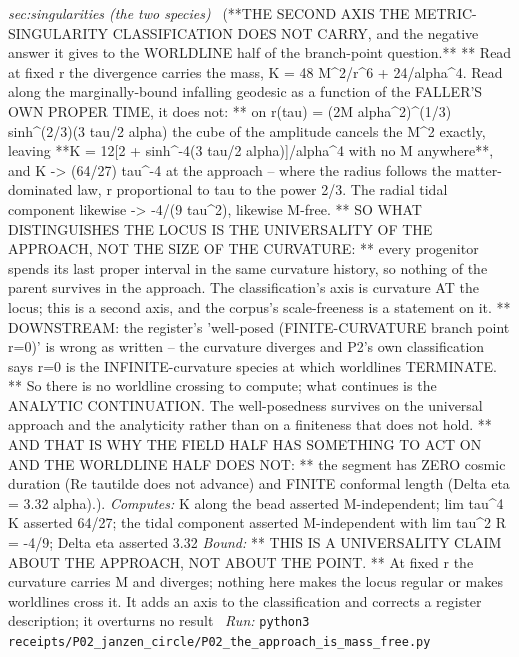 \begin{description}
\textit{sec:singularities (the two species)} \ (**THE SECOND AXIS THE METRIC-SINGULARITY CLASSIFICATION DOES NOT CARRY, and the negative answer it gives to the WORLDLINE half of the branch-point question.** ** Read at fixed r the divergence carries the mass, K = 48 M\textasciicircum{}2/r\textasciicircum{}6 + 24/alpha\textasciicircum{}4. Read along the marginally-bound infalling geodesic as a function of the FALLER'S OWN PROPER TIME, it does not: ** on r(tau) = (2M alpha\textasciicircum{}2)\textasciicircum{}(1/3) sinh\textasciicircum{}(2/3)(3 tau/2 alpha) the cube of the amplitude cancels the M\textasciicircum{}2 exactly, leaving **K = 12[2 + sinh\textasciicircum{}-4(3 tau/2 alpha)]/alpha\textasciicircum{}4 with no M anywhere**, and K -> (64/27) tau\textasciicircum{}-4 at the approach -- where the radius follows the matter-dominated law, r proportional to tau to the power 2/3. The radial tidal component likewise -> -4/(9 tau\textasciicircum{}2), likewise M-free. ** SO WHAT DISTINGUISHES THE LOCUS IS THE UNIVERSALITY OF THE APPROACH, NOT THE SIZE OF THE CURVATURE: ** every progenitor spends its last proper interval in the same curvature history, so nothing of the parent survives in the approach. The classification's axis is curvature AT the locus; this is a second axis, and the corpus's scale-freeness is a statement on it. ** DOWNSTREAM: the register's 'well-posed (FINITE-CURVATURE branch point r=0)' is wrong as written -- the curvature diverges and P2's own classification says r=0 is the INFINITE-curvature species at which worldlines TERMINATE. ** So there is no worldline crossing to compute; what continues is the ANALYTIC CONTINUATION. The well-posedness survives on the universal approach and the analyticity rather than on a finiteness that does not hold. ** AND THAT IS WHY THE FIELD HALF HAS SOMETHING TO ACT ON AND THE WORLDLINE HALF DOES NOT: ** the segment has ZERO cosmic duration (Re tautilde does not advance) and FINITE conformal length (\textbar{}Delta eta\textbar{} = 3.32 alpha).). 
\emph{Computes:} K along the bead asserted M-independent; lim tau\textasciicircum{}4 K asserted 64/27; the tidal component asserted M-independent with lim tau\textasciicircum{}2 R = -4/9; \textbar{}Delta eta\textbar{} asserted 3.32
 \emph{Bound:} ** THIS IS A UNIVERSALITY CLAIM ABOUT THE APPROACH, NOT ABOUT THE POINT. ** At fixed r the curvature carries M and diverges; nothing here makes the locus regular or makes worldlines cross it. It adds an axis to the classification and corrects a register description; it overturns no result
\ \emph{Run:} \texttt{python3 receipts/P02\_janzen\_circle/P02\_the\_approach\_is\_mass\_free.py}

\end{description}
